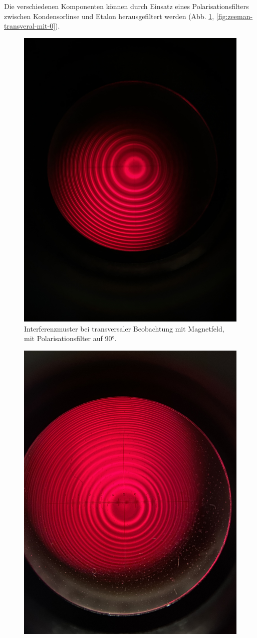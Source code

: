 \documentclass{article}
\begin{document}
\begin{multicols}{2}
Die verschiedenen Komponenten können durch Einsatz eines Polarisationsfilters zwischen Kondensorlinse und Etalon
herausgefiltert werden (Abb. \ref{fig:zeeman-transveral-mit-90}, \ref{fig:zeeman-transveral-mit-0}).
\begin{figure}[H]
  \centering
  \includegraphics[width=.8\linewidth]{zeeman-transversal-mit-90}
  \caption{Interferenzmuster bei transversaler Beobachtung mit Magnetfeld, mit Polarisationsfilter auf \ang{90}.}
  \label{fig:zeeman-transveral-mit-90}
\end{figure}
\begin{figure}[H]
  \centering
  \includegraphics[width=.8\linewidth]{zeeman-transversal-mit-0}

\end{figure}
\end{multicols}
\end{document}

